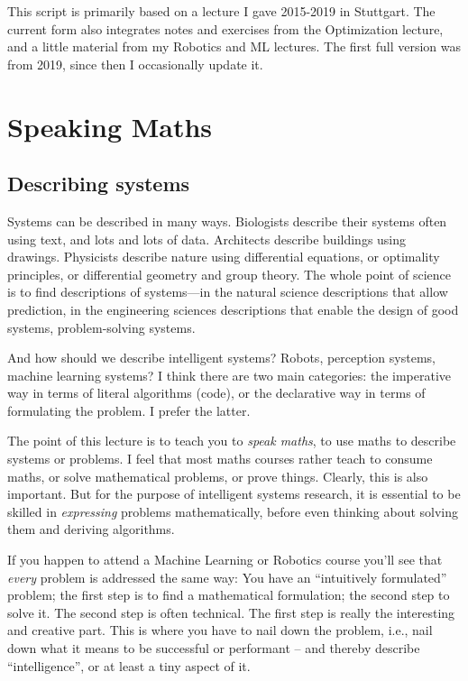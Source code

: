 This script is primarily based on a lecture I gave 2015-2019 in Stuttgart.
The current form also integrates notes and exercises from the Optimization lecture, and a little material from my Robotics and ML lectures. The first full version was from 2019, since then I occasionally update it.


{\small\tableofcontents}

\section{Speaking Maths}

\subsection{Describing systems}

Systems can be described in many ways. Biologists describe their
systems often using text, and lots and lots of data. Architects
describe buildings using drawings. Physicists describe nature using
differential equations, or optimality principles, or differential
geometry and group theory. The whole point of science is to find
descriptions of systems---in the natural science descriptions that
allow prediction, in the engineering sciences descriptions
that enable the design of good systems, problem-solving systems.

And how should we describe intelligent systems? Robots, perception
systems, machine learning systems? I think there are two main categories:
the imperative way in terms of literal algorithms (code), or the
declarative way in terms of formulating the problem. I prefer the latter.

The point of this lecture is to teach you to \emph{speak maths}, to
use maths to describe systems or problems. I feel that most maths
courses rather teach to consume maths, or solve mathematical problems,
or prove things. Clearly, this is also important. But for the purpose
of intelligent systems research, it is essential to be skilled
in \emph{expressing} problems mathematically, before even thinking
about solving them and deriving algorithms.

If you happen to attend a Machine Learning or Robotics course you'll
see that \emph{every} problem is addressed the same way: You have an
``intuitively formulated'' problem; the first step is to find a
mathematical formulation; the second step to solve it. The second step
is often technical. The first step is really the interesting and
creative part. This is where you have to nail down the problem, i.e.,
nail down what it means to be successful or performant -- and
thereby describe ``intelligence'', or at least a tiny aspect of it.

